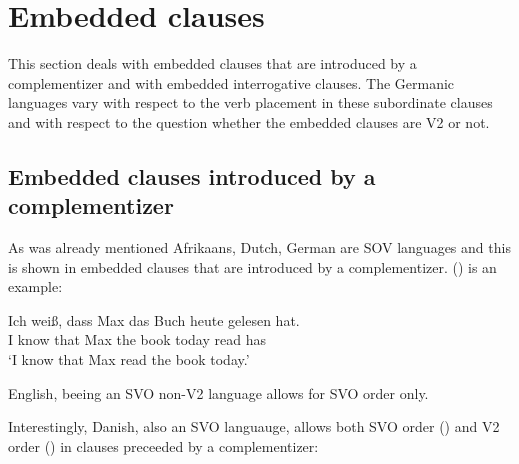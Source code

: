 \section{Embedded clauses}
\label{sec-embeeded-clauses}

This section deals with embedded clauses that are introduced by a complementizer and with
embedded interrogative clauses. The Germanic languages vary with respect to the verb placement in
these subordinate clauses and with respect to the question whether the embedded clauses are V2 or not.

\subsection{Embedded clauses introduced by a complementizer}

As was already mentioned Afrikaans, Dutch, German are SOV languages and this is shown in embedded
clauses that are introduced by a complementizer. () is an example:

\ea
\gll Ich weiß, dass Max das Buch heute gelesen hat.\\
     I know that Max the book today read has\\
\glt `I know that Max read the book today.'
\z



English, beeing an SVO non-V2 language allows for SVO order only.
\z

Interestingly, Danish, also an SVO languauge, allows both SVO order () and V2 order () in clauses
preceeded by a complementizer:
\z

